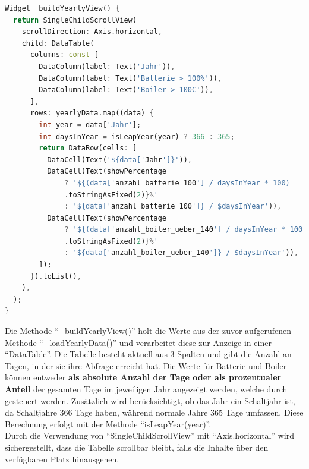 \documentclass[11pt]{scrartcl}
\begin{document}
    \begin{lstlisting}[language=Dart]
Widget _buildYearlyView() {
  return SingleChildScrollView(
    scrollDirection: Axis.horizontal,
    child: DataTable(
      columns: const [
        DataColumn(label: Text('Jahr')),
        DataColumn(label: Text('Batterie > 100%')),
        DataColumn(label: Text('Boiler > 100C')),
      ],
      rows: yearlyData.map((data) {
        int year = data['Jahr'];
        int daysInYear = isLeapYear(year) ? 366 : 365;
        return DataRow(cells: [
          DataCell(Text('${data['Jahr']}')),
          DataCell(Text(showPercentage
              ? '${(data['anzahl_batterie_100'] / daysInYear * 100)
              .toStringAsFixed(2)}%'
              : '${data['anzahl_batterie_100']} / $daysInYear')),
          DataCell(Text(showPercentage
              ? '${(data['anzahl_boiler_ueber_140'] / daysInYear * 100)
              .toStringAsFixed(2)}%'
              : '${data['anzahl_boiler_ueber_140']} / $daysInYear')),
        ]);
      }).toList(),
    ),
  );
}
    \end{lstlisting}

    Die Methode \enquote{\_buildYearlyView()} holt die Werte aus der zuvor aufgerufenen Methode
    \enquote{\_loadYearlyData()} und verarbeitet diese zur Anzeige in einer \enquote{DataTable}.
    Die Tabelle besteht aktuell aus 3 Spalten und gibt die Anzahl an Tagen, in der sie ihre Abfrage erreicht hat.
    Die Werte für Batterie und Boiler können entweder \textbf{als absolute Anzahl der Tage oder als prozentualer Anteil}
    der gesamten Tage im jeweiligen Jahr angezeigt werden, welche durch  gesteuert werden.
    Zusätzlich wird berücksichtigt, ob das Jahr ein Schaltjahr ist, da Schaltjahre 366 Tage haben, während normale Jahre 365 Tage umfassen.
    Diese Berechnung erfolgt mit der Methode \enquote{isLeapYear(year)}. \\
    Durch die Verwendung von \enquote{SingleChildScrollView} mit \enquote{Axis.horizontal} wird sichergestellt,
    dass die Tabelle scrollbar bleibt, falls die Inhalte über den verfügbaren Platz hinausgehen.
\end{document}
